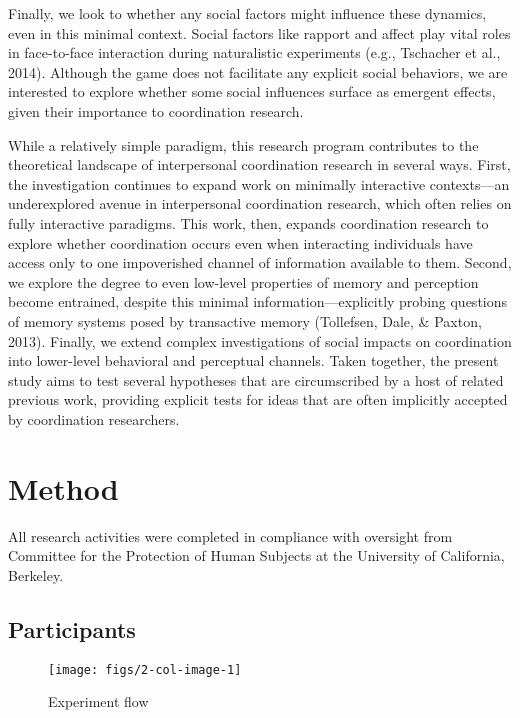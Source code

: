 \documentclass[10pt, letterpaper]{article}
\newenvironment{CodeChunk}{}{}
\begin{document}
Finally, we look to whether any social factors might influence these
dynamics, even in this minimal context. Social factors like rapport and
affect play vital roles in face-to-face interaction during naturalistic
experiments (e.g., Tschacher et al., 2014). Although the game does not
facilitate any explicit social behaviors, we are interested to explore
whether some social influences surface as emergent effects, given their
importance to coordination research.

While a relatively simple paradigm, this research program contributes to
the theoretical landscape of interpersonal coordination research in
several ways. First, the investigation continues to expand work on
minimally interactive contexts---an underexplored avenue in
interpersonal coordination research, which often relies on fully
interactive paradigms. This work, then, expands coordination research to
explore whether coordination occurs even when interacting individuals
have access only to one impoverished channel of information available to
them. Second, we explore the degree to even low-level properties of
memory and perception become entrained, despite this minimal
information---explicitly probing questions of memory systems posed by
transactive memory (Tollefsen, Dale, \& Paxton, 2013). Finally, we
extend complex investigations of social impacts on coordination into
lower-level behavioral and perceptual channels. Taken together, the
present study aims to test several hypotheses that are circumscribed by
a host of related previous work, providing explicit tests for ideas that
are often implicitly accepted by coordination researchers.

\section{Method}\label{method}

All research activities were completed in compliance with oversight from
Committee for the Protection of Human Subjects at the University of
California, Berkeley.

\subsection{Participants}\label{participants}

\begin{CodeChunk}
\begin{figure*}[h]

{\centering \texttt{[image: figs/2-col-image-1]} 

}

\caption[Experiment flow]{Experiment flow}\label{fig:2-col-image}
\end{figure*}
\end{CodeChunk}
\end{document}

